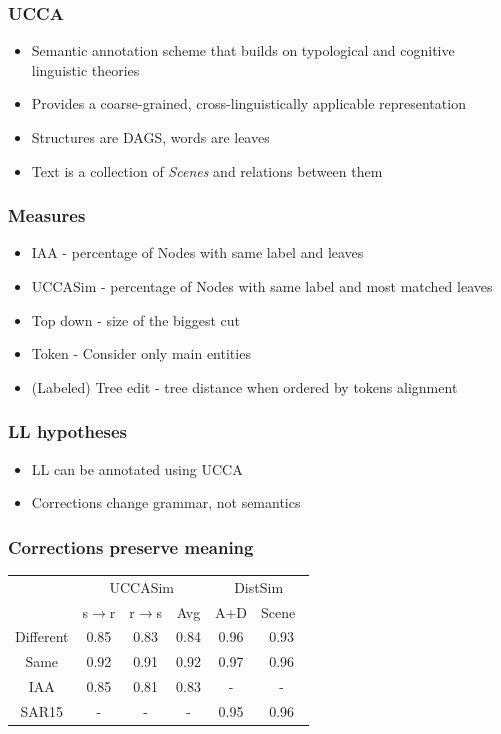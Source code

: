 \documentclass{beamer}
\begin{document}
\begin{frame}
	\frametitle{UCCA}
	\begin{itemize}
		\item Semantic annotation scheme that builds on
		typological and cognitive linguistic theories
		\item Provides a coarse-grained, cross-linguistically
		applicable representation
		\item Structures are DAGS, words are leaves
		\item Text is a collection of {\it Scenes} and relations between them
	\end{itemize}
\end{frame}
\begin{frame}[label=distances-details]
	\frametitle{Measures}
	\begin{itemize}
		\item IAA - percentage of Nodes with same label and leaves
		\item UCCASim - percentage of Nodes with same label and most matched leaves
		\item Top down - size of the biggest cut
		\item Token - Consider only main entities
		\item (Labeled) Tree edit - tree distance when ordered by tokens alignment 
	\end{itemize}
	\hyperlink{distances}{}
\end{frame}

\begin{frame}[label=UCCA]
	\frametitle{LL hypotheses}
	\begin{itemize}
		\item LL can be annotated using UCCA
		\item Corrections change grammar, not semantics
	\end{itemize}
	\hyperlink{annotated}{}
\end{frame}

\begin{frame}
	\frametitle{Corrections preserve meaning}
	\begin{table}
		\begin{tabular}{c|c|c|c||c|c|}
			\cline{2-6} 
			& \multicolumn{3}{c||}{\sc UCCASim} & \multicolumn{2}{c|}{\sc DistSim}\\ \cline{2-6}
			& s$\rightarrow$r & r$\rightarrow$s & Avg & A+D & Scene\
			\\
			\hline
			Different & 0.85 & 0.83 & 0.84 & 0.96 & 0.93
			\\
			Same & 0.92 & 0.91 & 0.92 & 0.97 & 0.96
			\\
			\hline
			\hline
			IAA & 0.85 & 0.81 & 0.83 & - & -
			\\
			\hline
			SAR15 & - & - & - & 0.95 & 0.96 \\
			\hline
		\end{tabular}
	\end{table}
\end{frame}
\end{document}
